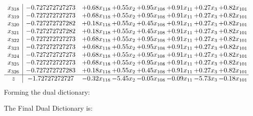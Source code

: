 \documentclass[8pt]{article}
\begin{document}
\[\begin{array}{c| c c@{\hskip 2pt} c@{\hskip 2pt} c@{\hskip 2pt} c@{\hskip 2pt} c@{\hskip 2pt} c@{\hskip 2pt} }
 x_{318}   &  -0.727272727273 & +  0.68 x_{118} & +  0.55 x_{2} & +  0.95 x_{108} & +  0.91 x_{11} & +  0.27 x_{3} & +  0.82 x_{101}\\
 x_{319}   &  -0.727272727273 & +  0.68 x_{118} & +  0.55 x_{2} & +  0.95 x_{108} & +  0.91 x_{11} & +  0.27 x_{3} & +  0.82 x_{101}\\
 x_{320}   &  -0.727272727282 & +  0.18 x_{118} & +  0.55 x_{2} & +  0.45 x_{108} & +  0.91 x_{11} & +  0.27 x_{3} & +  0.82 x_{101}\\
 x_{321}   &  -0.727272727282 & +  0.18 x_{118} & +  0.55 x_{2} & +  0.45 x_{108} & +  0.91 x_{11} & +  0.27 x_{3} & +  0.82 x_{101}\\
 x_{322}   &  -0.727272727273 & +  0.68 x_{118} & +  0.55 x_{2} & +  0.95 x_{108} & +  0.91 x_{11} & +  0.27 x_{3} & +  0.82 x_{101}\\
 x_{323}   &  -0.727272727273 & +  0.68 x_{118} & +  0.55 x_{2} & +  0.95 x_{108} & +  0.91 x_{11} & +  0.27 x_{3} & +  0.82 x_{101}\\
 x_{324}   &  -0.727272727273 & +  0.68 x_{118} & +  0.55 x_{2} & +  0.95 x_{108} & +  0.91 x_{11} & +  0.27 x_{3} & +  0.82 x_{101}\\
 x_{325}   &  -0.727272727273 & +  0.68 x_{118} & +  0.55 x_{2} & +  0.95 x_{108} & +  0.91 x_{11} & +  0.27 x_{3} & +  0.82 x_{101}\\
 x_{326}   &  -0.727272727283 & +  0.18 x_{118} & +  0.55 x_{2} & +  0.45 x_{108} & +  0.91 x_{11} & +  0.27 x_{3} & +  0.82 x_{101}\\
\hline
z    &  -1.72727272727 & -0.32 x_{118} & -5.45 x_{2} & -0.05 x_{108} & -0.09 x_{11} & -5.73 x_{3} & -0.18 x_{101}\\
\end{array}\]
Forming the dual dictionary:

The Final Dual Dictionary is: 
\end{document}
